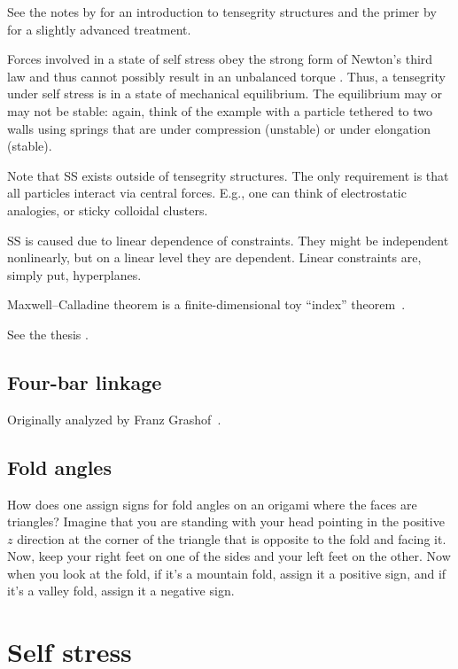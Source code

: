 See the notes by \citet{connelly2022} for an introduction to tensegrity structures and the primer by \citet{williams2003} for a slightly advanced treatment.

Forces involved in a state of self stress obey the strong form of Newton's third law and thus cannot possibly result in an unbalanced torque \cite[\S 1.2]{goldstein2002}.
Thus, a tensegrity under self stress is in a state of mechanical equilibrium.
The equilibrium may or may not be stable: again, think of the example with a particle tethered to two walls using springs that are under compression (unstable) or under elongation (stable).

Note that SS exists outside of tensegrity structures.
The only requirement is that all particles interact via central forces.
E.g., one can think of electrostatic analogies, or sticky colloidal clusters.

SS is caused due to linear dependence of constraints.
They might be independent nonlinearly, but on a linear level they are dependent.
Linear constraints are, simply put, hyperplanes.

Maxwell--Calladine theorem is a finite-dimensional toy ``index'' theorem~\cite[\S 2.2]{nakahara2003}.

See the thesis \cite{lengyel2002}.

\subsection{Four-bar linkage}

Originally analyzed by Franz Grashof~\cite[pp.~113--118]{grashof1883}.


\subsection{Fold angles}

How does one assign signs for fold angles on an origami where the faces are triangles?
Imagine that you are standing with your head pointing in the positive $z$ direction at the corner of the triangle that is opposite to the fold and facing it.
Now, keep your right feet on one of the sides and your left feet on the other.
Now when you look at the fold, if it's a mountain fold, assign it a positive sign, and if it's a valley fold, assign it a negative sign.

\section{Self stress}

